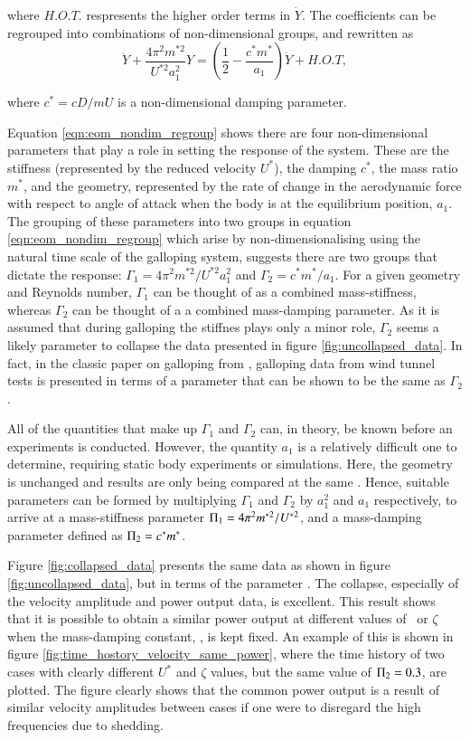 where $H.O.T.$ respresents the higher order terms in $\dot{Y}$. The coefficients can be regrouped into combinations of non-dimensional groups, and rewritten as
\begin{equation}
  \label{eqn:eom_nondim_regroup}
  \ddot{Y} + \frac{4\pi^{2}m^{*2}}{U^{*2}a_1^2}Y = \left(\frac{1}{2} - \frac{c^*m^*}{a_1}\right)\dot{Y} + H.O.T,
\end{equation}

where $c^*=cD/mU$ is a non-dimensional damping parameter.

Equation \ref{eqn:eom_nondim_regroup} shows there are four non-dimensional parameters that play a role in setting the response of the system. These are the stiffness (represented by the reduced velocity $U^*$), the damping $c^*$, the mass ratio $m^*$, and the geometry, represented by the rate of change in the aerodynamic force with respect to angle of attack when the body is at the equilibrium position, $a_1$. The grouping of these parameters into two groups in equation \ref{eqn:eom_nondim_regroup} which arise by non-dimensionalising using the natural time scale of the galloping system, suggests there are two groups that dictate the response: $\Gamma_1 = 4\pi^2m^{*2}/U^{*2}a_1^2$ and $\Gamma_2 = c^*m^*/a_1$. For a given geometry and Reynolds number, $\Gamma_1$ can be thought of as a combined mass-stiffness, whereas $\Gamma_2$ can be thought of a a combined mass-damping parameter. As it is assumed that during galloping the stiffnes plays only a minor role, $\Gamma_2$ seems a likely parameter to collapse the data presented in figure \ref{fig:uncollapsed_data}. In fact, in the classic paper on galloping from \citet{Parkinson1964}, galloping data from wind tunnel tests is presented in terms of a parameter that can be shown to be the same as $\Gamma_2$.

All of the quantities that make up $\Gamma_1$ and $\Gamma_2$ can, in theory, be known before an experiments is conducted. However, the quantity $a_1$ is a relatively difficult one to determine, requiring static body experiments or simulations. Here, the geometry is unchanged and results are only being compared at the same \reynoldsnumber. Hence, suitable parameters can be formed by multiplying $\Gamma_1$ and $\Gamma_2$ by $a_1^2$ and $a_1$ respectively, to arrive at a mass-stiffness parameter $\Pi_1 =  4\pi^2m^{*2}/U^{*2}$, and a mass-damping parameter defined as $\Pi_2 = c^*m^*$.

Figure \ref{fig:collapsed_data} presents the same data as shown in figure \ref{fig:uncollapsed_data}, but in terms of the parameter \massdamp. The collapse, especially of the velocity amplitude and power output data, is excellent. This result shows that it is possible to obtain a similar power output at different values of \ustar\ or $\zeta$ when the mass-damping constant, \massdamp, is kept fixed. An example of this is shown in figure \ref{fig:time_hostory_velocity_same_power}, where the time history of two cases with clearly different $U^*$ and $\zeta$ values, but the same value of $\Pi_2=0.3$, are plotted. The figure clearly shows that the common power output is a result of similar velocity amplitudes between cases if one were to disregard the high frequencies due to shedding. 

